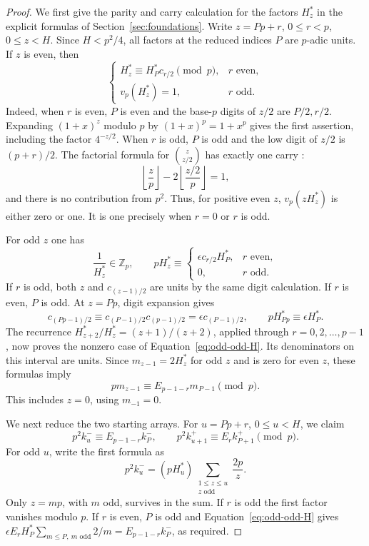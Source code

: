 \begin{proof}
We first give the parity and carry calculation for the factors $H_z^*$
in the explicit formulas of Section~\ref{sec:foundations}.  Write
$z=Pp+r$, $0\le r<p$, $0\le z<H$.  Since $H<p^2/4$, all factors at
the reduced indices $P$ are $p$-adic units.  If $z$ is even, then
\begin{equation}\label{eq:odd-even-H}
 \begin{cases}
 H_z^*\equiv H_P^*c_{r/2}\pmod p,&r\text{ even},\\
 v_p(H_z^*)=1,&r\text{ odd}.
 \end{cases}
\end{equation}
Indeed, when $r$ is even, $P$ is even and the base-$p$ digits of $z/2$
are $P/2,r/2$.  Expanding $(1+x)^z$ modulo $p$ by
$(1+x)^p=1+x^p$ gives the first assertion, including the factor $4^{-z/2}$.
When $r$ is odd, $P$ is odd and the low digit of $z/2$ is $(p+r)/2$.
The factorial formula for $\binom z{z/2}$ has exactly one carry \cite{Legendre1808,Kummer1852}:
\[
 \left\lfloor\frac zp\right\rfloor
       -2\left\lfloor\frac{z/2}{p}\right\rfloor=1,
\]
and there is no contribution from $p^2$.  Thus, for positive even $z$,
$v_p(zH_z^*)$ is either zero or one.  It is one precisely when $r=0$
or $r$ is odd.

For odd $z$ one has
\begin{equation}\label{eq:odd-odd-H}
 \frac1{H_z^*}\in\mathbb Z_p,\qquad
 pH_z^*\equiv
 \begin{cases}
 \epsilon c_{r/2}H_P^*,&r\text{ even},\\
 0,&r\text{ odd}.
 \end{cases}
\end{equation}
If $r$ is odd, both $z$ and $c_{(z-1)/2}$ are units by the same
digit calculation.  If $r$ is even, $P$ is odd.  At $z=Pp$, digit
expansion gives
\[
 c_{(Pp-1)/2}\equiv c_{(P-1)/2}c_{(p-1)/2}
       =\epsilon c_{(P-1)/2},
 \qquad pH_{Pp}^*\equiv\epsilon H_P^*.
\]
The recurrence $H_{z+2}^*/H_z^*=(z+1)/(z+2)$, applied through
$r=0,2,\ldots,p-1$, now proves the nonzero case of
Equation~\eqref{eq:odd-odd-H}.  Its denominators on this interval are
units.  Since $m_{z-1}=2H_z^*$ for odd $z$ and is zero for even $z$,
these formulas imply
\begin{equation}\label{eq:odd-moment-digit}
 pm_{z-1}\equiv E_{p-1-r}m_{P-1}\pmod p.
\end{equation}
This includes $z=0$, using $m_{-1}=0$.

We next reduce the two starting arrays.  For $u=Pp+r$, $0\le u<H$,
we claim
\begin{equation}\label{eq:odd-starting-digits}
 p^2k^-_u\equiv E_{p-1-r}k^-_P,
 \qquad
 p^2k^+_{u+1}\equiv E_r k^+_{P+1}\pmod p.
\end{equation}
For odd $u$, write the first formula as
\[
 p^2 k^-_u=(pH_u^*)
           \sum_{\substack{1\le z\le u\\z\text{ odd}}}\frac{2p}{z}.
\]
Only $z=mp$, with $m$ odd, survives in the sum.  If $r$ is odd the
first factor vanishes modulo $p$.  If $r$ is even, $P$ is odd and
Equation~\eqref{eq:odd-odd-H} gives
$\epsilon E_rH_P^*\sum_{m\le P,\ m\text{ odd}}2/m
 =E_{p-1-r}k^-_P$, as required.


\end{proof}
